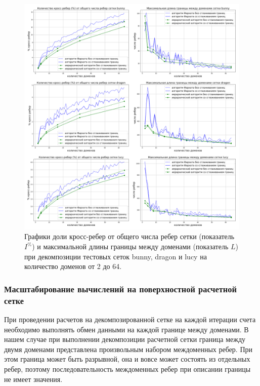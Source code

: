 \begin{figure}[H]
\centering
\includegraphics[width=1.0\textwidth]{fig/par_smooth_graphics.pdf}
\singlespacing
{}\caption{Графики доли кросс-ребер от общего числа ребер сетки (показатель $I^{\%}$) и максимальной длины границы между доменами (показатель $L$) при декомпозиции тестовых сеток bunny, dragon и lucy на количество доменов от 2 до 64.}
\label{fig:text_2_smooth_graphics}
\end{figure}

\subsubsection{Масштабирование вычислений на поверхностной расчетной сетке}

При проведении расчетов на декомпозированной сетке на каждой итерации счета необходимо выполнять обмен данными на каждой границе между доменами.
В нашем случае при выполнении декомпозиции расчетной сетки граница между двумя доменами представлена произвольным набором междоменных ребер.
При этом граница может быть разрывной, она и вовсе может состоять из отдельных ребер, поэтому последовательность междоменных ребер при описании границы не имеет значения.

